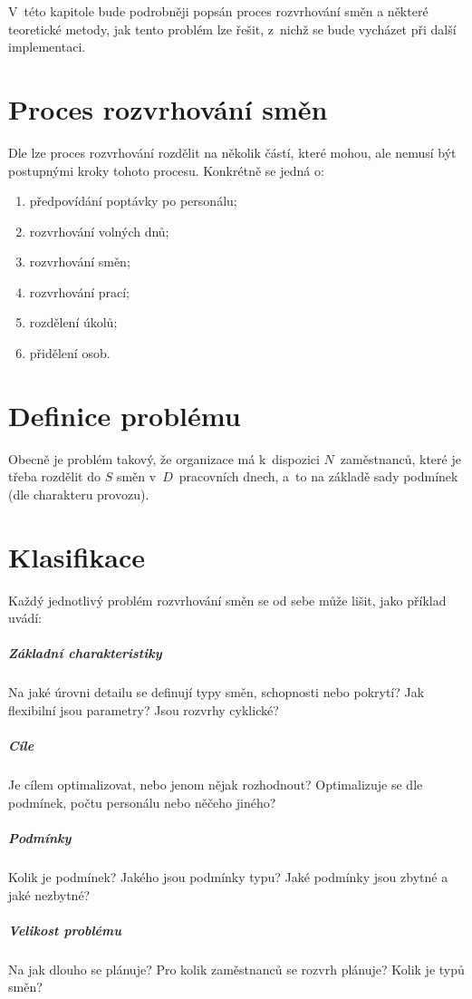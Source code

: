 \documentclass[twoside]{ctuthesis}
\begin{document}
V~této kapitole bude podrobněji popsán proces rozvrhování směn a některé teoretické metody, jak tento problém lze řešit, z~nichž se bude vycházet při další implementaci.

\section{Proces rozvrhování směn}
Dle \cite{ernst2004staff} lze proces rozvrhování rozdělit na několik částí, které mohou, ale nemusí být postupnými kroky tohoto procesu. Konkrétně se jedná o:
\begin{enumerate}
	\item předpovídání poptávky po personálu;
	\item rozvrhování volných dnů;
	\item rozvrhování směn;
	\item rozvrhování prací;
	\item rozdělení úkolů;
	\item přidělení osob.
\end{enumerate}

\section{Definice problému}

Obecně je problém takový, že organizace má k~dispozici $N$~zaměstnanců, které je třeba rozdělit do $S$ směn v~$D$~pracovních dnech, a~to na základě sady podmínek (dle charakteru provozu).

\section{Klasifikace}
\label{sec:clasif}

Každý jednotlivý problém rozvrhování směn se od sebe může lišit, \cite{de2011categorisation} jako příklad uvádí:

\subparagraph{Základní charakteristiky}
Na jaké úrovni detailu se definují typy směn, schopnosti nebo pokrytí? Jak flexibilní jsou parametry? Jsou rozvrhy cyklické?

\subparagraph{Cíle}
Je cílem optimalizovat, nebo jenom nějak rozhodnout? Optimalizuje se dle podmínek, počtu personálu nebo něčeho jiného?

\subparagraph{Podmínky}
Kolik je podmínek? Jakého jsou podmínky typu? Jaké podmínky jsou zbytné a jaké nezbytné?

\subparagraph{Velikost problému}
Na jak dlouho se plánuje? Pro kolik zaměstnanců se rozvrh plánuje? Kolik je typů směn?
\end{document}
